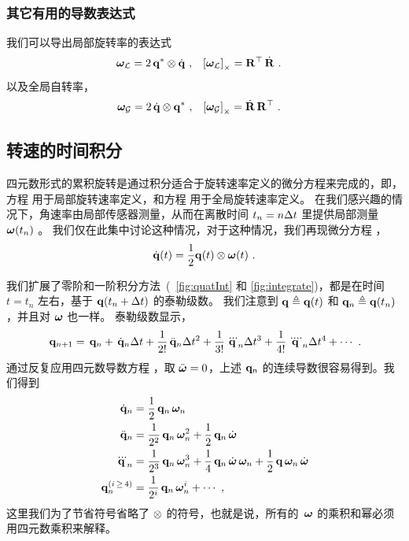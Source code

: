 \subsubsection{其它有用的导数表达式}

我们可以导出局部旋转率的表达式
%
\begin{align}
{\bm \omega}_{\mathcal{L}} &= 2\,{\bf q}^*\otimes\dot{{\bf q}}~, 
&
\left[{\bm \omega}_{\mathcal{L}}\right]_\times &= {\bf R}^{\top}\,\dot{{\bf R}}~.
\end{align}%
%
以及全局自转率，
%
\begin{align}
{\bm \omega}_{\mathcal{G}} &= 2\,\dot{{\bf q}}\otimes{\bf q}^*~, 
&
\left[{\bm \omega}_{\mathcal{G}}\right]_\times &= \dot{{\bf R}}\,{\bf R}^{\top}~.
\end{align}%




\subsection{转速的时间积分}

四元数形式的累积旋转是通过积分适合于旋转速率定义的微分方程来完成的，即，方程  用于局部旋转速率定义，和方程  用于全局旋转速率定义。 
在我们感兴趣的情况下，角速率由局部传感器测量，从而在离散时间 $t_n=n\Delta t$ 里提供局部测量 ${\bm \omega}(t_n)$ 。
我们仅在此集中讨论这种情况，对于这种情况，我们再现微分方程 ，
%
\begin{align}
\dot{{\bf q}}(t) 
= \frac12{\bf q}(t)\otimes{\bm \omega}(t) 
~.
\label{equ:intLocal}
\end{align}

我们扩展了零阶和一阶积分方法~(~\ref{fig:quatInt} 和 \ref{fig:integrate})，都是在时间 $t=t_n$ 左右，基于 ${\bf q}(t_n+\Delta t)$ 的泰勒级数。 
我们注意到 ${\bf q}\triangleq{\bf q}(t)$ 和 ${\bf q}_n\triangleq{\bf q}(t_n)$，并且对 ${\bm \omega}$ 也一样。 
%
泰勒级数显示， 
%
\begin{align}
\,{\bf q}_{n+1} = \,{\bf q}_n + \,\dot{{\bf q}}_n\Delta t + \frac1{2!}\,\ddot{{\bf q}}_n\Delta t^2 + \frac1{3!}\,\dddot{{\bf q}}_n\Delta t^3 + \frac1{4!}\,\ddddot{\bf q}_n\Delta t^4 + \cdots~.
\label{equ:qnTaylor}
\end{align}
%
通过反复应用四元数导数方程 ，取 $\ddot{{\bm \omega}}=0$，上述 ${\bf q}_n$ 的连续导数很容易得到。我们得到
%
\begin{subequations}
%
\begin{align}
\,\dot{{\bf q}}_n 
&= \frac12\,{\bf q}_n\,{\bm \omega}_n \\
\,\ddot{{\bf q}}_n 
&= \frac1{2^2}\,{\bf q}_n\,{\bm \omega}_n^2+\frac12\,{\bf q}_n\,\dot{{\bm \omega}} \\
\,\dddot{{\bf q}}_n 
&= \frac1{2^3}\,{\bf q}_n\,{\bm \omega}_n^3 + \frac14\,{\bf q}_n\,\dot{{\bm \omega}}\,{\bm \omega}_n + \frac12\,{\bf q}\,{\bm \omega}_n\,\dot{{\bm \omega}} \\
\,{\bf q}_n^{(i\,\ge\,4)} 
&= \frac1{2^i}\,{\bf q}_n\,{\bm \omega}_n^i + \cdots~,
\end{align}%
\label{equ:qnDerivatives}%
\end{subequations}%
%
这里我们为了节省符号省略了 $\otimes$ 的符号，也就是说，所有的 $\,{\bm \omega}$ 的乘积和幂必须用四元数乘积来解释。

